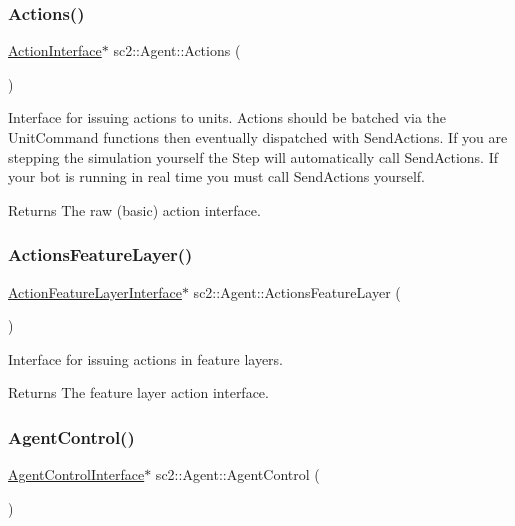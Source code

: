 \subsubsection{\texorpdfstring{Actions()}{Actions()}}
{\footnotesize\ttfamily \hyperlink{classsc2_1_1_action_interface}{Action\+Interface}$\ast$ sc2\+::\+Agent\+::\+Actions (\begin{DoxyParamCaption}{ }\end{DoxyParamCaption})}

Interface for issuing actions to units. Actions should be batched via the Unit\+Command functions then eventually dispatched with Send\+Actions. If you are stepping the simulation yourself the Step will automatically call Send\+Actions. If your bot is running in real time you must call Send\+Actions yourself. \begin{DoxyReturn}{Returns}
The raw (basic) action interface. 
\end{DoxyReturn}
\mbox{\label{classsc2_1_1_agent_a0e267c48e4e41e37dc14185113493cc4}} 
\subsubsection{\texorpdfstring{Actions\+Feature\+Layer()}{ActionsFeatureLayer()}}
{\footnotesize\ttfamily \hyperlink{classsc2_1_1_action_feature_layer_interface}{Action\+Feature\+Layer\+Interface}$\ast$ sc2\+::\+Agent\+::\+Actions\+Feature\+Layer (\begin{DoxyParamCaption}{ }\end{DoxyParamCaption})}

Interface for issuing actions in feature layers. \begin{DoxyReturn}{Returns}
The feature layer action interface. 
\end{DoxyReturn}
\mbox{\label{classsc2_1_1_agent_ad47b7a7383489567360ce1697d5e1675}} 
\subsubsection{\texorpdfstring{Agent\+Control()}{AgentControl()}}
{\footnotesize\ttfamily \hyperlink{classsc2_1_1_agent_control_interface}{Agent\+Control\+Interface}$\ast$ sc2\+::\+Agent\+::\+Agent\+Control (\begin{DoxyParamCaption}{ }\end{DoxyParamCaption})}

